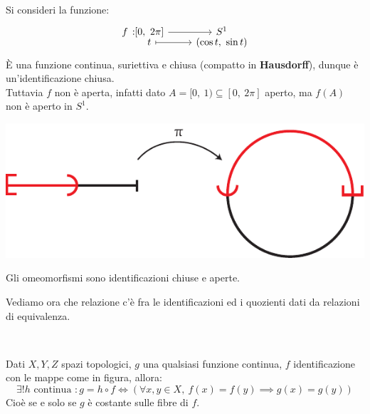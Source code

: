 \begin{example}
	Si consideri la funzione:
	\begin{equation*}
		\funztot f {[0, \ 2\pi]} {S^1} t {(\cos t, \ \sin t)}
	\end{equation*}
	È una funzione continua, suriettiva e chiusa (compatto in \textbf{Hausdorff}), dunque è un'identificazione chiusa. \\
	Tuttavia $f$ non è aperta, infatti dato $A=[0, \ 1)\subseteq [0, \ 2\pi]$ aperto, ma $f(A)$ non è aperto in $S^1$.
		\begin{center}
			\includegraphics[trim=0cm 0cm 0cm 0cm,clip,scale=0.9]{images/half_circle-eps-converted-to.pdf}
		\end{center}
	\vspace{-6mm}
\end{example}
\begin{observe}
	Gli omeomorfismi sono identificazioni chiuse e aperte.
\end{observe}
Vediamo ora che relazione c'è fra le identificazioni ed i quozienti dati da relazioni di equivalenza.
\begin{theorema}~{}\\
\begin{minipage}[t]{0.83\textwidth}
		Dati $X,Y,Z$ spazi topologici, $g$ una qualsiasi funzione continua, $f$ identificazione con le mappe come in figura, allora:
		\begin{equation*}
			\exists! h \text{ continua } \colon g=h\circ f \iff \left( \forall x,y\in X, \ f(x)=f(y)\implies g(x)=g(y)  \right)
		\end{equation*}
		Cioè se e solo se $g$ è costante sulle fibre di $f$.
\end{minipage}
	\begin{minipage}[t]{0.13\textwidth}\vspace{-10pt}
	\end{minipage}
\end{theorema}
